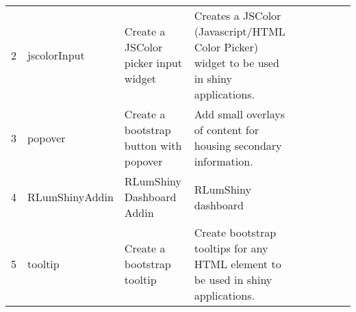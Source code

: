 \begin{table}[ht]
\begin{tabular}{rllllllll}
 \\ 
  2 & jscolorInput & Create a JSColor picker input widget & Creates a JSColor (Javascript/HTML Color Picker) widget to be used in shiny applications. &  &  &  &  &  \\ 
  3 & popover & Create a bootstrap button with popover & Add small overlays of content for housing secondary information. &  &  &  &  &  \\ 
  4 & RLumShinyAddin & RLumShiny Dashboard Addin & RLumShiny dashboard &  &  &  &  &  \\ 
  5 & tooltip & Create a bootstrap tooltip & Create bootstrap tooltips for any HTML element to be used in shiny applications. &  &  &  &  &  \\ 
   \hline
\end{tabular}
\end{table}

